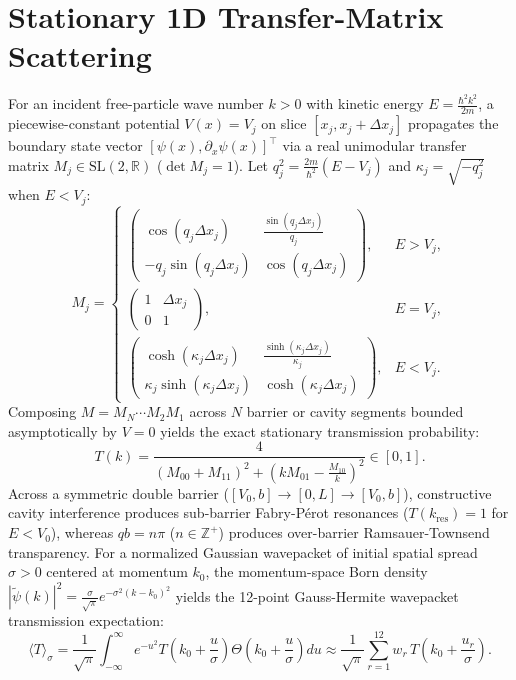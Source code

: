 \documentclass{article}
\begin{document}
\section{Stationary 1D Transfer-Matrix Scattering}
For an incident free-particle wave number $k > 0$ with kinetic energy $E = \frac{\hbar^2 k^2}{2m}$, a piecewise-constant potential $V(x) = V_j$ on slice $[x_j, x_j + \Delta x_j]$ propagates the boundary state vector $[\psi(x), \partial_x \psi(x)]^\top$ via a real unimodular transfer matrix $M_j \in \mathrm{SL}(2, \mathbb{R})$ ($\det M_j = 1$). Let $q_j^2 = \frac{2m}{\hbar^2}(E - V_j)$ and $\kappa_j = \sqrt{-q_j^2}$ when $E < V_j$:
\begin{equation}
    M_j = \begin{cases}
        \begin{pmatrix} \cos(q_j \Delta x_j) & \frac{\sin(q_j \Delta x_j)}{q_j} \\ -q_j \sin(q_j \Delta x_j) & \cos(q_j \Delta x_j) \end{pmatrix}, & E > V_j, \\[10pt]
        \begin{pmatrix} 1 & \Delta x_j \\ 0 & 1 \end{pmatrix}, & E = V_j, \\[10pt]
        \begin{pmatrix} \cosh(\kappa_j \Delta x_j) & \frac{\sinh(\kappa_j \Delta x_j)}{\kappa_j} \\ \kappa_j \sinh(\kappa_j \Delta x_j) & \cosh(\kappa_j \Delta x_j) \end{pmatrix}, & E < V_j.
    \end{cases}
\end{equation}
Composing $M = M_N \cdots M_2 M_1$ across $N$ barrier or cavity segments bounded asymptotically by $V = 0$ yields the exact stationary transmission probability:
\begin{equation}
    T(k) = \frac{4}{(M_{00} + M_{11})^2 + \left(k M_{01} - \frac{M_{10}}{k}\right)^2} \in [0, 1].
\end{equation}
Across a symmetric double barrier ($[V_0, b] \to [0, L] \to [V_0, b]$), constructive cavity interference produces sub-barrier Fabry-P\'erot resonances ($T(k_{\mathrm{res}}) = 1$ for $E < V_0$), whereas $q b = n\pi$ ($n \in \mathbb{Z}^+$) produces over-barrier Ramsauer-Townsend transparency. For a normalized Gaussian wavepacket of initial spatial spread $\sigma > 0$ centered at momentum $k_0$, the momentum-space Born density $|\tilde{\psi}(k)|^2 = \frac{\sigma}{\sqrt{\pi}} e^{-\sigma^2 (k - k_0)^2}$ yields the 12-point Gauss-Hermite wavepacket transmission expectation:
\begin{equation}
    \langle T \rangle_\sigma = \frac{1}{\sqrt{\pi}} \int_{-\infty}^{\infty} e^{-u^2} T\!\left(k_0 + \frac{u}{\sigma}\right) \Theta\!\left(k_0 + \frac{u}{\sigma}\right) du \approx \frac{1}{\sqrt{\pi}} \sum_{r=1}^{12} w_r \, T\!\left(k_0 + \frac{u_r}{\sigma}\right).
\end{equation}
\end{document}
